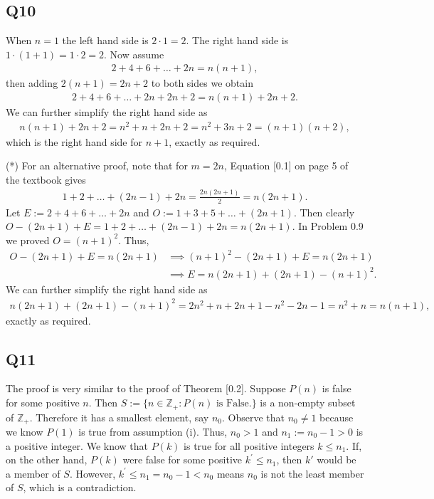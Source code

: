 \documentclass[12pt]{article}
\def\Z{{\mathbb Z}}        %
\numberwithin{theorem}{section}
\numberwithin{equation}{section}
\numberwithin{remark}{section}
\numberwithin{definition}{section}
\numberwithin{theorem}{section}
\numberwithin{lemma}{section}
\numberwithin{example}{section}
\begin{document}
\subsection{Q10}

When $n=1$ the left hand side is $2\cdot1=2$. The right hand side is $1\cdot(1+1)=1\cdot2=2$. Now assume
\begin{align*}
	2+4+6+\ldots+2n = n(n+1),
\end{align*}
then adding $2(n+1)=2n+2$ to both sides we obtain 
\begin{align*}
	2+4+6+\ldots+2n + 2n+2 = n(n+1) + 2n+2.
\end{align*}
We can further simplify the right hand side as 
\begin{align*}
	n(n+1) + 2n+2 = n^2 + n + 2n + 2 = n^2 + 3n + 2 = (n+1)(n+2),
\end{align*}
which is the right hand side for $n+1$, exactly as required. 

\vspace{\baselineskip}

\noindent(*) For an alternative proof, note that for $m=2n$, Equation [0.1] on page 5 of the textbook gives
\begin{align*}
	1 + 2 + \ldots + (2n-1) + 2n = \frac{2n(2n+1)}{2}=n(2n+1).
\end{align*}
Let $E:=2+4+6 + \ldots+2n$ and $O:=1 + 3 + 5 + \ldots + (2n+1)$. Then clearly $O-(2n+1)+E=1+2+\ldots+(2n-1)+2n=n(2n+1)$. In Problem 0.9 we proved $O=(n+1)^2$. Thus,
\begin{align*}
	O-(2n+1)+E=n(2n+1) &\implies (n+1)^2-(2n+1)+E=n(2n+1) \\
	&\implies E=n(2n+1)+(2n+1)-(n+1)^2.
\end{align*}
We can further simplify the right hand side as
\begin{align*}
	n(2n+1)+(2n+1)-(n+1)^2=2n^2+n+2n+1-n^2-2n-1=n^2+n=n(n+1), 
\end{align*}
exactly as required. 



\subsection{Q11}

The proof is very similar to the proof of Theorem [0.2]. Suppose $P(n)$ is false for some positive $n$. Then $S:=\{n\in\Z_+:P(n)\text{ is False.}\}$ is a non-empty subset of $\Z_+$. Therefore it has a smallest element, say $n_0$. Observe that $n_0\neq1$ because we know $P(1)$ is true from assumption (i). Thus, $n_0 > 1$ and $n_1:=n_0-1>0$ is a positive integer. We know that $P(k)$ is true for all positive integers $k\le n_1$. If, on the other hand, $P(k)$ were false for some positive $k^\prime\le n_1$, then $k\prime$ would be a member of $S$. However, $k^\prime\le n_1 = n_0 - 1 < n_0$ means $n_0$ is not the least member of $S$, which is a contradiction. 
\end{document}
